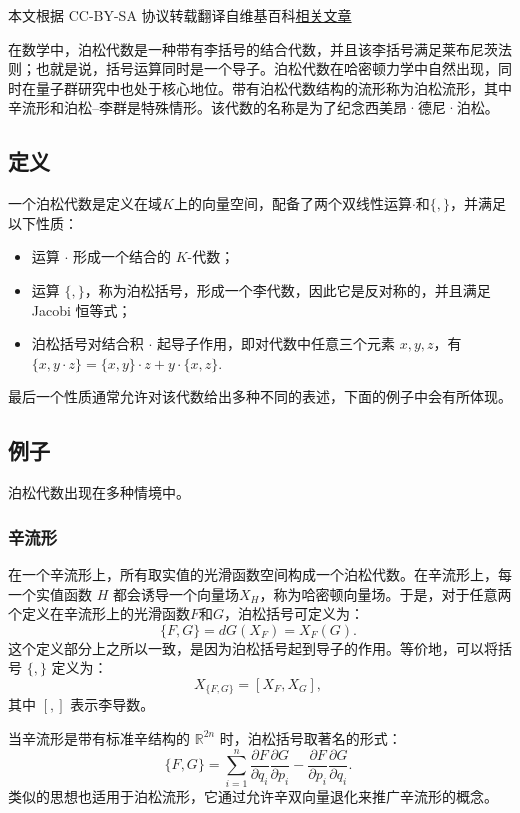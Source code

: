 
本文根据 CC-BY-SA 协议转载翻译自维基百科\href{https://en.wikipedia.org/wiki/Poisson_algebra}{相关文章}

在数学中，泊松代数是一种带有李括号的结合代数，并且该李括号满足莱布尼茨法则；也就是说，括号运算同时是一个导子。泊松代数在哈密顿力学中自然出现，同时在量子群研究中也处于核心地位。带有泊松代数结构的流形称为泊松流形，其中辛流形和泊松–李群是特殊情形。该代数的名称是为了纪念西美昂·德尼·泊松。
\subsection{定义}
一个泊松代数是定义在域$K$上的向量空间，配备了两个双线性运算$\cdot$和$\{,\}$，并满足以下性质：
\begin{itemize}
\item 运算 $\cdot$ 形成一个结合的 $K$-代数；
\item 运算 $\{,\}$，称为泊松括号，形成一个李代数，因此它是反对称的，并且满足Jacobi 恒等式；
\item 泊松括号对结合积 $\cdot$ 起导子作用，即对代数中任意三个元素 $x, y, z$，有$\{x, y \cdot z\} = \{x, y\} \cdot z + y \cdot \{x, z\}$.
\end{itemize}
最后一个性质通常允许对该代数给出多种不同的表述，下面的例子中会有所体现。
\subsection{例子}
泊松代数出现在多种情境中。
\subsubsection{辛流形}
在一个辛流形上，所有取实值的光滑函数空间构成一个泊松代数。在辛流形上，每一个实值函数 $H$ 都会诱导一个向量场$X_H$，称为哈密顿向量场。于是，对于任意两个定义在辛流形上的光滑函数$F$和$G$，泊松括号可定义为：
$$
\{F,G\} = dG(X_F) = X_F(G).~
$$
这个定义部分上之所以一致，是因为泊松括号起到导子的作用。等价地，可以将括号 $\{,\}$ 定义为：
$$
X_{\{F,G\}} = [X_F, X_G],~
$$
其中 $[,]$ 表示李导数。

当辛流形是带有标准辛结构的 $\mathbb{R}^{2n}$ 时，泊松括号取著名的形式：
$$
\{F,G\} = \sum_{i=1}^n 
\frac{\partial F}{\partial q_i}\frac{\partial G}{\partial p_i} - 
\frac{\partial F}{\partial p_i}\frac{\partial G}{\partial q_i}.~
$$
类似的思想也适用于泊松流形，它通过允许辛双向量退化来推广辛流形的概念。
